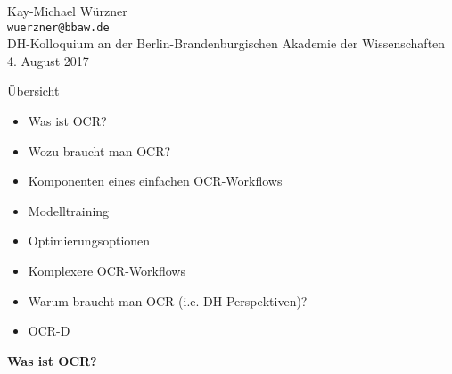 \documentclass{bbawslides}
\begin{document}
\providecommand{\Title}{}


\begin{bbawtitle}
  \vspace*{3em}%
  Kay-Michael Würzner\\[-.25em]%
  \textcolor{urlColor}{\texttt{{\small wuerzner@bbaw.de}}}
  \\[3em]
  {\footnotesize{%
    DH-Kolloquium an der Berlin-Brandenburgischen Akademie der Wissenschaften\\%
    4. August 2017\\%
  }}
\end{bbawtitle}
\slideStyleFrame

\renewcommand{\footerText}{\tiny 4. August 2017, DH-Kolloquium, BBAW}

\begin{bbawslide}{Übersicht}
  \vspace*{7mm}%
  \centerslidestrue%
  \begin{itemize}
  \item Was ist OCR?
  \item Wozu braucht man OCR?
  \item Komponenten eines einfachen OCR-Workflows
  \item Modelltraining
  \item Optimierungsoptionen
  \item Komplexere OCR-Workflows
  \item Warum braucht man OCR (i.e. DH-Perspektiven)?
  \item OCR-D
  \end{itemize}
\end{bbawslide}

\begin{bbawpart}{\Large\bf Was ist OCR?}
\end{bbawpart}
\end{document}

